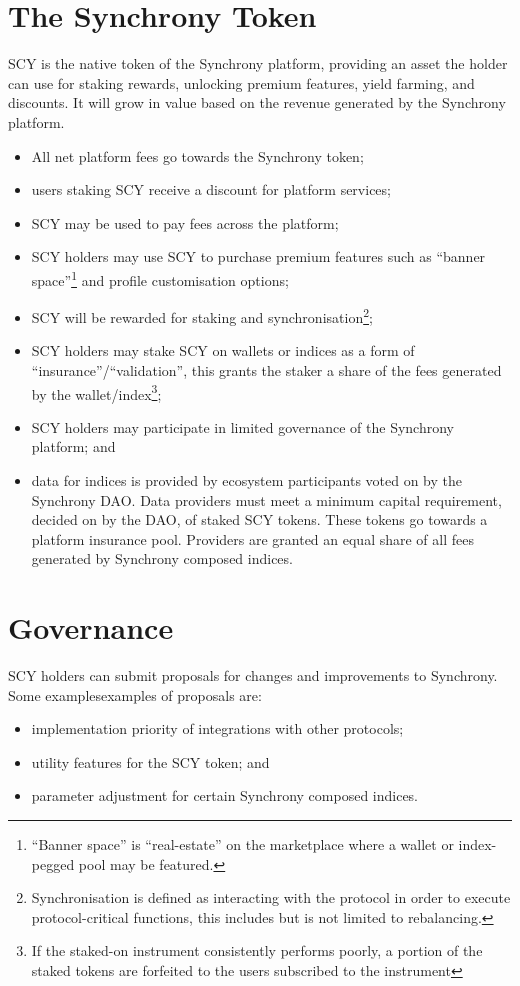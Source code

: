 \documentclass[10pt]{article}
\begin{document}
					\section{The Synchrony Token}
					SCY is the native token of the Synchrony platform, providing an asset the holder
					can use for staking rewards, unlocking premium features, yield farming, and
					discounts. It will grow in value based on the revenue generated by the Synchrony
					platform.
					\begin{itemize}
						\item All net platform fees go towards the Synchrony token;
						\item users staking SCY receive a discount for platform services;
						\item SCY may be used to pay fees across the platform;
						\item SCY holders may use SCY to purchase premium features such as ``banner
							space''\footnote[8]{``Banner space'' is ``real-estate'' on the
							marketplace where a wallet or index-pegged pool may be featured.} and
							profile customisation options;
						\item SCY will be rewarded for staking and
							synchronisation\footnote[9]{Synchronisation is defined as interacting
							with the protocol in order to execute protocol-critical functions, this
							includes but is not limited to rebalancing.};
						\item SCY holders may stake SCY on wallets or indices as a form of
							``insurance''/``validation'', this grants the staker a share of the fees
							generated by the wallet/index\footnote[10]{If the staked-on instrument
							consistently performs poorly, a portion of the staked tokens are
							forfeited to the users subscribed to the instrument};
						\item SCY holders may participate in limited governance of the Synchrony
							platform; and
						\item data for indices is provided by ecosystem participants voted on by the
							Synchrony DAO. Data providers must meet a minimum capital requirement,
							decided on by the DAO, of staked SCY tokens. These tokens go towards
							a platform insurance pool. Providers are granted an equal share of all
							fees generated by Synchrony composed indices.
					\end{itemize}

					\section{Governance}
					SCY holders can submit proposals for changes and improvements to Synchrony. Some
					examplesexamples  of proposals are:
					\begin{itemize}
						\item implementation priority of integrations with other protocols;
						\item utility features for the SCY token; and
						\item parameter adjustment for certain Synchrony composed indices.
					\end{itemize}
\end{document}
